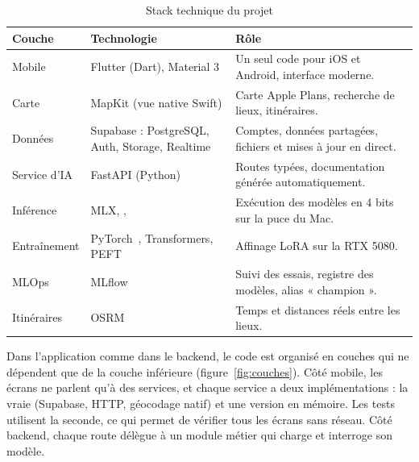 \begin{table}[H]
\centering
\small
\begin{tabularx}{\textwidth}{|L{2.6cm}|L{4.6cm}|Y|}
\hline
{}\textbf{Couche} & \textbf{Technologie} & \textbf{Rôle} \\ \hline
Mobile & Flutter (Dart), Material 3 & Un seul code pour iOS et Android, interface moderne. \\ \hline
Carte & MapKit (vue native Swift) & Carte Apple Plans, recherche de lieux, itinéraires. \\ \hline
Données & Supabase : PostgreSQL, Auth, Storage, Realtime & Comptes, données partagées, fichiers et
mises à jour en direct. \\ \hline
Service d'IA & FastAPI (Python) & Routes typées, documentation générée automatiquement. \\ \hline
Inférence & MLX, ,  & Exécution des modèles en 4 bits sur la puce du Mac. \\ \hline
Entraînement & PyTorch~\cite{pytorch}, Transformers, PEFT & Affinage LoRA sur la RTX 5080. \\ \hline
MLOps & MLflow & Suivi des essais, registre des modèles, alias « champion ». \\ \hline
Itinéraires & OSRM & Temps et distances réels entre les lieux. \\ \hline
\end{tabularx}
\caption{Stack technique du projet}
\label{tab:stack}
\end{table}

Dans l'application comme dans le backend, le code est organisé en couches qui ne dépendent
que de la couche inférieure (figure~\ref{fig:couches}). Côté mobile, les écrans ne parlent
qu'à des services, et chaque service a deux implémentations : la vraie (Supabase, HTTP,
géocodage natif) et une version en mémoire. Les tests utilisent la seconde, ce qui permet de
vérifier tous les écrans sans réseau. Côté backend, chaque route délègue à un module métier
qui charge et interroge son modèle.

